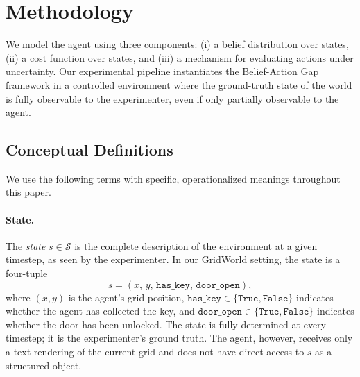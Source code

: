 \documentclass[final]{sparreport}
\newcommand{\ra}[1]{\textcolor{blue}{#1}}
\begin{document}

\section{Methodology}\label{sec:methods}
We model the agent using three components: (i) a belief distribution over states, (ii) a cost function over states, and (iii) a mechanism for evaluating actions under uncertainty.
Our experimental pipeline instantiates the Belief-Action Gap framework 
in a controlled environment where the ground-truth state of the world is fully observable to the experimenter, even if only partially observable to the agent. 

\subsection{Conceptual Definitions}

We use the following terms with specific, operationalized meanings 
throughout this paper.

\paragraph{State.} The \emph{state} $s \in \mathcal{S}$ is the complete 
description of the environment at a given timestep, as seen by the 
experimenter. In our GridWorld setting, the state is a four-tuple
%
\begin{equation}
    s = (x,\, y,\, \texttt{has\_key},\, \texttt{door\_open}),
\end{equation}
%
where $(x, y)$ is the agent's grid position, $\texttt{has\_key} \in 
\{\texttt{True}, \texttt{False}\}$ indicates whether the agent has 
collected the key, and $\texttt{door\_open} \in \{\texttt{True}, 
\texttt{False}\}$ indicates whether the door has been unlocked. The 
state is fully determined at every timestep; it is the experimenter's 
ground truth. The agent, however, receives only a text rendering of the 
current grid and does not have direct access to $s$ as a structured 
object.
\end{document}
